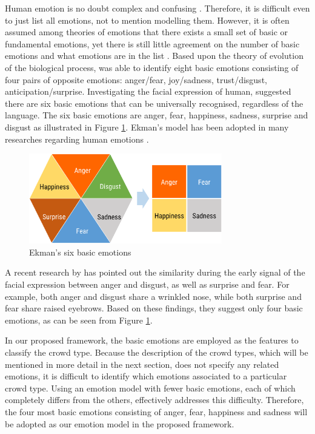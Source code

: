 Human emotion is no doubt complex and confusing \citet{plutchik2001nature}. Therefore, it is difficult even to just list all emotions, not to mention modelling them. However, it is often assumed among theories of emotions that there exists a small set of basic or fundamental emotions, yet there is still little agreement on the number of basic emotions and what emotions are in the list \citep{Ortony1990}. Based upon the theory of evolution of the biological process, \citet{plutchik2001integration} was able to identify eight basic emotions consisting of four pairs of opposite emotions: anger/fear, joy/sadness, trust/disgust, anticipation/surprise. Investigating the facial expression of human, \citet{ekman1971constants} suggested there are six basic emotions that can be universally recognised, regardless of the language. The six basic emotions are anger, fear, happiness, sadness, surprise and disgust as illustrated in Figure \ref{fig:emotionModel}. Ekman's model has been adopted in many researches regarding human emotions \citep{mohammad2014using, roberts2012empatweet, alm2005emotions}. 

\begin{figure}[htb!]
\centering    
\includegraphics[width=0.75\textwidth]{EkmanModel}
\caption{Ekman's six basic emotions}
\label{fig:emotionModel}
\end{figure}

A recent research by \cite{Jack2014} has pointed out the similarity during the early signal of the facial expression between anger and disgust, as well as surprise and fear. For example, both anger and disgust share a wrinkled nose, while both surprise and fear share raised eyebrows. Based on these findings, they suggest only four basic emotions, as can be seen from Figure \ref{fig:emotionModel}.

In our proposed framework, the basic emotions are employed as the features to classify the crowd type. Because the description of the crowd types, which will be mentioned in more detail in the next section, does not specify any related emotions, it is difficult to identify which emotions associated to a particular crowd type. Using an emotion model with fewer basic emotions, each of which completely differs from the others, effectively addresses this difficulty. Therefore, the four most basic emotions consisting of anger, fear, happiness and sadness will be adopted as our emotion model in the proposed framework.


